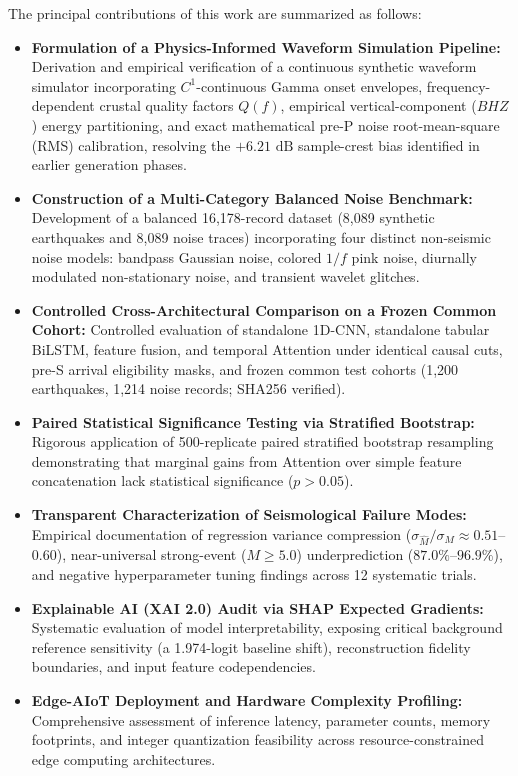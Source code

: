 \documentclass[journal]{IEEEtran}
\begin{document}
The principal contributions of this work are summarized as follows:
\begin{itemize}
    \item \textbf{Formulation of a Physics-Informed Waveform Simulation Pipeline:} Derivation and empirical verification of a continuous synthetic waveform simulator incorporating $C^1$-continuous Gamma onset envelopes, frequency-dependent crustal quality factors $Q(f)$, empirical vertical-component ($BHZ$) energy partitioning, and exact mathematical pre-P noise root-mean-square (RMS) calibration, resolving the $+6.21\text{ dB}$ sample-crest bias identified in earlier generation phases.
    \item \textbf{Construction of a Multi-Category Balanced Noise Benchmark:} Development of a balanced 16,178-record dataset (8,089 synthetic earthquakes and 8,089 noise traces) incorporating four distinct non-seismic noise models: bandpass Gaussian noise, colored $1/f$ pink noise, diurnally modulated non-stationary noise, and transient wavelet glitches.
    \item \textbf{Controlled Cross-Architectural Comparison on a Frozen Common Cohort:} Controlled evaluation of standalone 1D-CNN, standalone tabular BiLSTM, feature fusion, and temporal Attention under identical causal cuts, pre-S arrival eligibility masks, and frozen common test cohorts (1,200 earthquakes, 1,214 noise records; SHA256 verified).
    \item \textbf{Paired Statistical Significance Testing via Stratified Bootstrap:} Rigorous application of 500-replicate paired stratified bootstrap resampling demonstrating that marginal gains from Attention over simple feature concatenation lack statistical significance ($p > 0.05$).
    \item \textbf{Transparent Characterization of Seismological Failure Modes:} Empirical documentation of regression variance compression ($\sigma_{\hat{M}}/\sigma_M \approx 0.51$--$0.60$), near-universal strong-event ($M \ge 5.0$) underprediction ($87.0\%$--$96.9\%$), and negative hyperparameter tuning findings across 12 systematic trials.
    \item \textbf{Explainable AI (XAI 2.0) Audit via SHAP Expected Gradients:} Systematic evaluation of model interpretability, exposing critical background reference sensitivity (a 1.974-logit baseline shift), reconstruction fidelity boundaries, and input feature codependencies.
    \item \textbf{Edge-AIoT Deployment and Hardware Complexity Profiling:} Comprehensive assessment of inference latency, parameter counts, memory footprints, and integer quantization feasibility across resource-constrained edge computing architectures.
\end{itemize}
\end{document}
